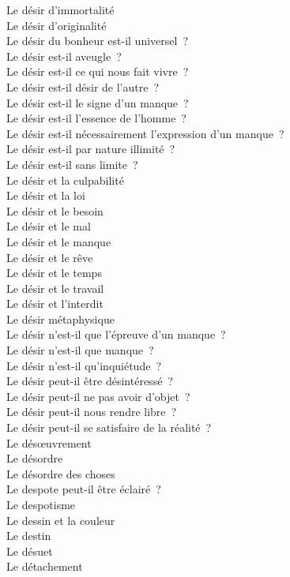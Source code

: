 \documentclass[a4paper,12pt]{article}
\begin{document}
Le désir d'immortalité \\
Le désir d'originalité \\
Le désir du bonheur est-il universel ? \\
Le désir est-il aveugle ? \\
Le désir est-il ce qui nous fait vivre ? \\
Le désir est-il désir de l'autre ? \\
Le désir est-il le signe d'un manque ? \\
Le désir est-il l'essence de l'homme ? \\
Le désir est-il nécessairement l'expression d'un manque ? \\
Le désir est-il par nature illimité ? \\
Le désir est-il sans limite ? \\
Le désir et la culpabilité \\
Le désir et la loi \\
Le désir et le besoin \\
Le désir et le mal \\
Le désir et le manque \\
Le désir et le rêve \\
Le désir et le temps \\
Le désir et le travail \\
Le désir et l'interdit \\
Le désir métaphysique \\
Le désir n'est-il que l'épreuve d'un manque ? \\
Le désir n'est-il que manque ? \\
Le désir n'est-il qu'inquiétude ? \\
Le désir peut-il être désintéressé ? \\
Le désir peut-il ne pas avoir d'objet ? \\
Le désir peut-il nous rendre libre ? \\
Le désir peut-il se satisfaire de la réalité ? \\
Le désœuvrement \\
Le désordre \\
Le désordre des choses \\
Le despote peut-il être éclairé ? \\
Le despotisme \\
Le dessin et la couleur \\
Le destin \\
Le désuet \\
Le détachement \\
\end{document}
